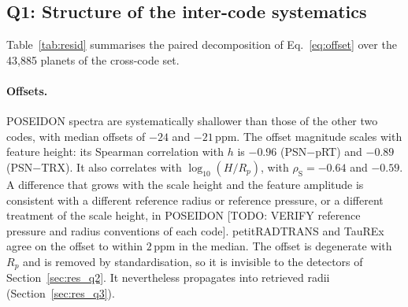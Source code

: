 \subsection{Q1: Structure of the inter-code systematics}
\label{sec:res_q1}

Table~\ref{tab:resid} summarises the paired decomposition of Eq.~\eqref{eq:offset} over the 43{,}885 planets of the cross-code set.

\begin{table}[t]
  \centering
  \caption{Paired inter-code residuals on noise-free spectra. $\delta$: wavelength-mean offset; $\rho$: root-mean-square shape residual after offset removal (Eq.~\ref{eq:rho}); $\rho/\bar h$: median relative residual. $n_{90}$, $n_{99}$: number of principal components of the relative residual needed for 90\% and 99\% of its variance. $R^2_{1\text{--}4}$: out-of-sample $R^2$ of the first four component scores regressed on $\bm{\theta}$, for relative and absolute residuals.}
  \label{tab:resid}
\end{table}

\paragraph{Offsets.}
POSEIDON spectra are systematically shallower than those of the other two codes, with median offsets of $-24$ and $-21\,\mathrm{ppm}$.
The offset magnitude scales with feature height: its Spearman correlation with $h$ is $-0.96$ (PSN$-$pRT) and $-0.89$ (PSN$-$TRX).
It also correlates with $\log_{10}(H/R_p)$, with $\rho_{\mathrm{S}}=-0.64$ and $-0.59$.
A difference that grows with the scale height and the feature amplitude is consistent with a different reference radius or reference pressure, or a different treatment of the scale height, in POSEIDON [TODO: VERIFY reference pressure and radius conventions of each code].
petitRADTRANS and TauREx agree on the offset to within $2\,\mathrm{ppm}$ in the median.
The offset is degenerate with $R_p$ and is removed by standardisation, so it is invisible to the detectors of Section~\ref{sec:res_q2}.
It nevertheless propagates into retrieved radii (Section~\ref{sec:res_q3}).

